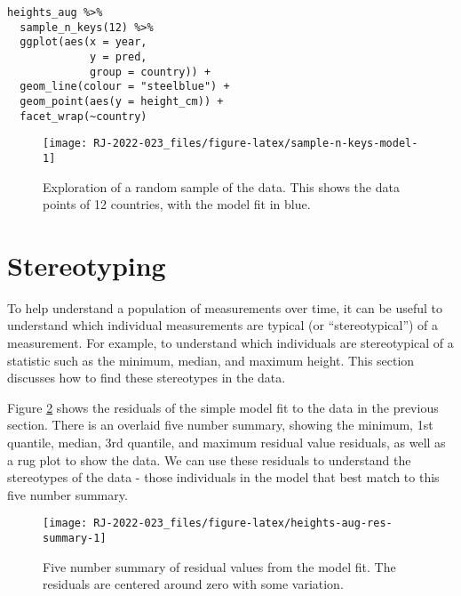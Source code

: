 \begin{verbatim}
heights_aug %>% 
  sample_n_keys(12) %>% 
  ggplot(aes(x = year,
             y = pred,
             group = country)) + 
  geom_line(colour = "steelblue") +
  geom_point(aes(y = height_cm)) + 
  facet_wrap(~country)
\end{verbatim}

\begin{figure}

{\centering \texttt{[image: RJ-2022-023\_files/figure-latex/sample-n-keys-model-1]} 

}

\caption{Exploration of a random sample of the data. This shows the data points of 12 countries, with the model fit in blue.}\label{fig:sample-n-keys-model}
\end{figure}

\hypertarget{stereotyping}{%
\section{Stereotyping}\label{stereotyping}}

To help understand a population of measurements over time, it can be useful to understand which individual measurements are typical (or ``stereotypical'') of a measurement. For example, to understand which individuals are stereotypical of a statistic such as the minimum, median, and maximum height. This section discusses how to find these stereotypes in the data.

Figure \ref{fig:heights-aug-res-summary} shows the residuals of the simple model fit to the data in the previous section. There is an overlaid five number summary, showing the minimum, 1st quantile, median, 3rd quantile, and maximum residual value residuals, as well as a rug plot to show the data. We can use these residuals to understand the stereotypes of the data - those individuals in the model that best match to this five number summary.

\begin{figure}

{\centering \texttt{[image: RJ-2022-023\_files/figure-latex/heights-aug-res-summary-1]} 

}

\caption{Five number summary of residual values from the model fit. The residuals are centered around zero with some variation.}\label{fig:heights-aug-res-summary}
\end{figure}

